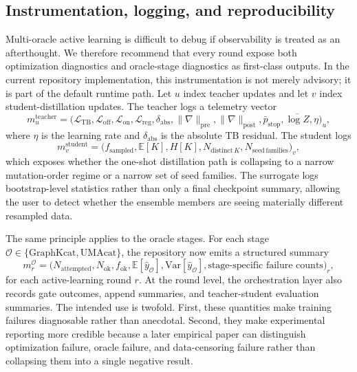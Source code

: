 \documentclass[11pt]{article}
\newcommand{\EE}{\mathbb{E}}
\newcommand{\Var}{\ensuremath{\mathrm{Var}}}
\begin{document}
	\subsection{Instrumentation, logging, and reproducibility}
	
	Multi-oracle active learning is difficult to debug if observability is treated as an afterthought. We therefore recommend that every round expose both optimization diagnostics and oracle-stage diagnostics as first-class outputs. In the current repository implementation, this instrumentation is not merely advisory; it is part of the default runtime path. Let $u$ index teacher updates and let $v$ index student-distillation updates. The teacher logs a telemetry vector
	\begin{equation}
		m_u^{\mathrm{teacher}}=
		\big(
		\mathcal{L}_{\mathrm{TB}},
		\mathcal{L}_{\mathrm{off}},
		\mathcal{L}_{\mathrm{on}},
		\mathcal{L}_{\mathrm{reg}},
		\delta_{\mathrm{abs}},
		\|\nabla\|_{\mathrm{pre}},
		\|\nabla\|_{\mathrm{post}},
		\bar p_{\mathrm{stop}},
		\overline{\log Z},
		\eta
		\big)_u,
	\end{equation}
	where $\eta$ is the learning rate and $\delta_{\mathrm{abs}}$ is the absolute TB residual. The student logs
	\begin{equation}
		m_v^{\mathrm{student}}=
		\big(
		f_{\mathrm{sampled}},
		\EE[K],
		H[K],
		N_{\mathrm{distinct}\,K},
		N_{\mathrm{seed\,families}}
		\big)_v,
	\end{equation}
	which exposes whether the one-shot distillation path is collapsing to a narrow mutation-order regime or a narrow set of seed families. The surrogate logs bootstrap-level statistics rather than only a final checkpoint summary, allowing the user to detect whether the ensemble members are seeing materially different resampled data.
	
	The same principle applies to the oracle stages. For each stage $\mathcal{O}\in\{\mathrm{GraphKcat},\mathrm{UMAcat}\}$, the repository now emits a structured summary
	\begin{equation}
		m_r^{\mathcal{O}}=
		\big(
		N_{\mathrm{attempted}},
		N_{\mathrm{ok}},
		f_{\mathrm{ok}},
		\EE[\hat y_{\mathcal{O}}],
		\Var[\hat y_{\mathcal{O}}],
		\text{stage-specific failure counts}
		\big)_r,
	\end{equation}
	for each active-learning round $r$. At the round level, the orchestration layer also records gate outcomes, append summaries, and teacher-student evaluation summaries. The intended use is twofold. First, these quantities make training failures diagnosable rather than anecdotal. Second, they make experimental reporting more credible because a later empirical paper can distinguish optimization failure, oracle failure, and data-censoring failure rather than collapsing them into a single negative result.
	
\end{document}
